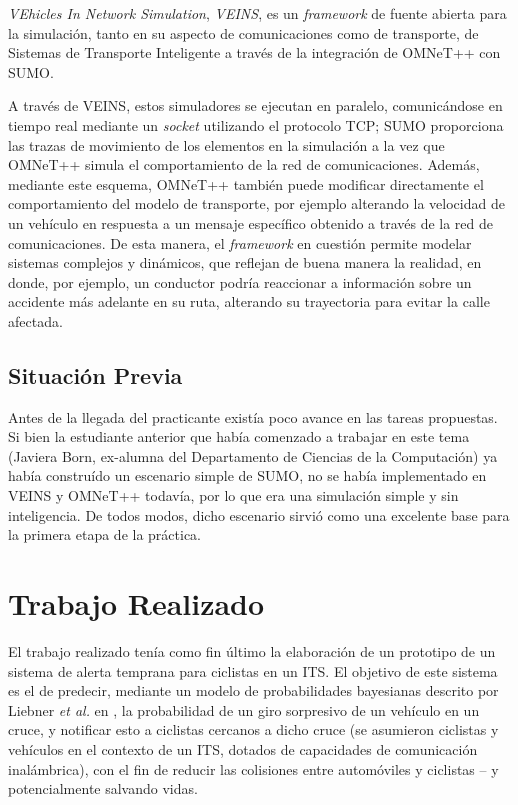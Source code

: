 \documentclass[11pt,letterpaper]{article}
\begin{document}
\emph{VEhicles In Network Simulation}, \emph{VEINS}, es un \emph{framework} de fuente abierta para la simulación, tanto en su aspecto de comunicaciones como de transporte, de Sistemas de Transporte Inteligente a través de la integración de OMNeT++ con SUMO.

A través de VEINS, estos simuladores se ejecutan en paralelo, comunicándose en tiempo real mediante un \textit{socket} utilizando el protocolo TCP; SUMO proporciona las trazas de movimiento de los elementos en la simulación a la vez que OMNeT++ simula el comportamiento de la red de comunicaciones. Además, mediante este esquema, OMNeT++ también puede modificar directamente el comportamiento del modelo de transporte, por ejemplo alterando la velocidad de un vehículo en respuesta a un mensaje específico obtenido a través de la red de comunicaciones. De esta manera, el \textit{framework} en cuestión permite modelar sistemas complejos y dinámicos, que reflejan de buena manera la realidad, en donde, por ejemplo, un conductor podría reaccionar a información sobre un accidente más adelante en su ruta, alterando su trayectoria para evitar la calle afectada.


\subsection{Situación Previa}\label{section:situacion_previa}

Antes de la llegada del practicante existía poco avance en las tareas propuestas. Si bien la estudiante anterior que había comenzado a trabajar en este tema (Javiera Born, ex-alumna del Departamento de Ciencias de la Computación) ya había construído un escenario simple de SUMO, no se había implementado en VEINS y OMNeT++ todavía, por lo que era una simulación simple y sin inteligencia. De todos modos, dicho escenario sirvió como una excelente base para la primera etapa de la práctica.

\newpage
\section{Trabajo Realizado}

El trabajo realizado tenía como fin último la elaboración de un prototipo de un sistema de alerta temprana para ciclistas en un ITS. El objetivo de este sistema es el de predecir, mediante un modelo de probabilidades bayesianas descrito por Liebner \textit{et al.} en \cite{prediction-paper}, la probabilidad de un giro sorpresivo de un vehículo en un cruce, y notificar esto a ciclistas cercanos a dicho cruce (se asumieron ciclistas y vehículos en el contexto de un ITS, dotados de capacidades de comunicación inalámbrica), con el fin de reducir las colisiones entre automóviles y ciclistas -- y potencialmente salvando vidas.
\end{document}
